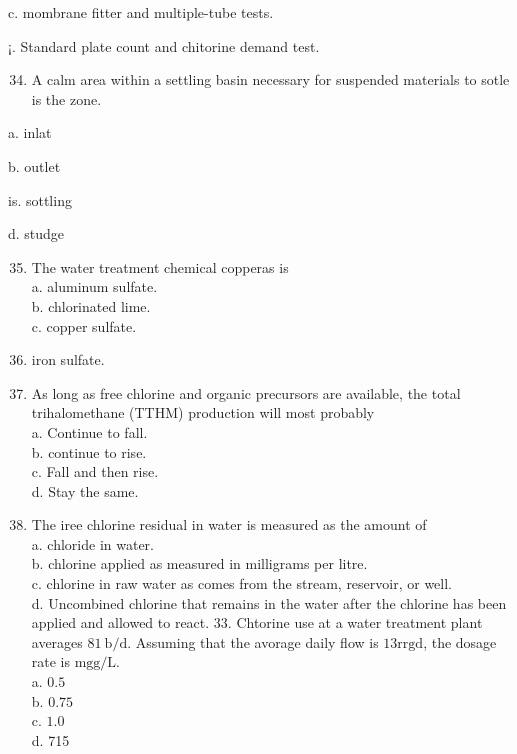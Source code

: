 \documentclass[10pt]{article}
\begin{document}
c. mombrane fitter and multiple-tube tests.

¡. Standard plate count and chitorine demand test.

\begin{enumerate}
  \setcounter{enumi}{33}
  \item A calm area within a settling basin necessary for suspended materials to sotle is the zone.
\end{enumerate}

a. inlat

b. outlet

is. sottling

d. studge

\begin{enumerate}
  \setcounter{enumi}{34}
  \item The water treatment chemical copperas is\\
a. aluminum sulfate.\\
b. chlorinated lime.\\
c. copper sulfate.

  \item iron sulfate.

  \item As long as free chlorine and organic precursors are available, the total trihalomethane (TTHM) production will most probably\\
a. Continue to fall.\\
b. continue to rise.\\
c. Fall and then rise.\\
d. Stay the same.

  \item The iree chlorine residual in water is measured as the amount of\\
a. chloride in water.\\
b. chlorine applied as measured in milligrams per litre.\\
c. chlorine in raw water as comes from the stream, reservoir, or well.\\
d. Uncombined chlorine that remains in the water after the chlorine has been applied and allowed to react. 33. Chtorine use at a water treatment plant averages $81 \mathrm{~b} / \mathrm{d}$. Assuming that the avorage daily flow is $13 \mathrm{rrgd}$, the dosage rate is $\mathrm{mgg} / \mathrm{L}$.\\
a. $0.5$\\
b. $0.75$\\
c. $1.0$\\
d. 715

\end{enumerate}
\end{document}

